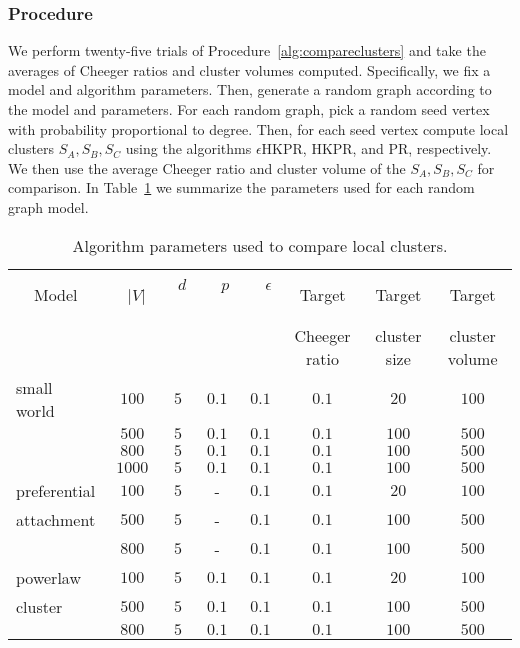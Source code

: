 \documentclass[runningheads,a4paper]{llncs}
\begin{document}
\subsubsection{Procedure} We perform twenty-five trials of
Procedure~\ref{alg:compareclusters} and take the averages of Cheeger ratios and
cluster volumes computed.  Specifically, we fix a model and algorithm
parameters.  Then, generate a random graph according to the model and
parameters.  For each random graph, pick a random seed vertex with probability
proportional to degree.  Then, for each seed vertex compute local clusters $S_A,
S_B, S_C$ using the algorithms $\epsilon$HKPR, HKPR, and PR, respectively.  We
then use the average Cheeger ratio and cluster volume of the $S_A, S_B, S_C$ for
comparison.  In Table~\ref{table:synthclusterparams} we summarize the parameters
used for each random graph model.

\begin{table}
\centering
\begin{tabular}{|p{2.6cm}|c|c|c|c|c|c|c|}
\hline
\multicolumn{1}{|c|}{Model}& ~~$|V|~~$ & ~$d$~ & ~~$p$~~ & ~~$\epsilon$~~ & Target        & Target       & Target\\
       &           &       &         &                & Cheeger ratio & cluster size & cluster volume\\
\hline\hline
small world  & $100$   & $5$ & $0.1$ & $0.1$ & $0.1$ & $20$  & $100$\\
             & $500$   & $5$ & $0.1$ & $0.1$ & $0.1$ & $100$ & $500$\\
             & $800$   & $5$ & $0.1$ & $0.1$ & $0.1$ & $100$ & $500$\\
             & $1000$  & $5$ & $0.1$ & $0.1$ & $0.1$ & $100$ & $500$\\\hline
preferential & $100$   & $5$ &   -   & $0.1$ & $0.1$ & $20$  & $100$\\
attachment   & $500$   & $5$ &   -   & $0.1$ & $0.1$ & $100$ & $500$\\
             & $800$   & $5$ &   -   & $0.1$ & $0.1$ & $100$ & $500$\\\hline
powerlaw     & $100$   & $5$ & $0.1$ & $0.1$ & $0.1$ & $20$  & $100$\\
cluster      & $500$   & $5$ & $0.1$ & $0.1$ & $0.1$ & $100$ & $500$\\
             & $800$   & $5$ & $0.1$ & $0.1$ & $0.1$ & $100$ & $500$\\
\hline
\end{tabular}
\caption{Algorithm parameters used to compare local clusters.}
\label{table:synthclusterparams} 
\end{table}
\end{document}
